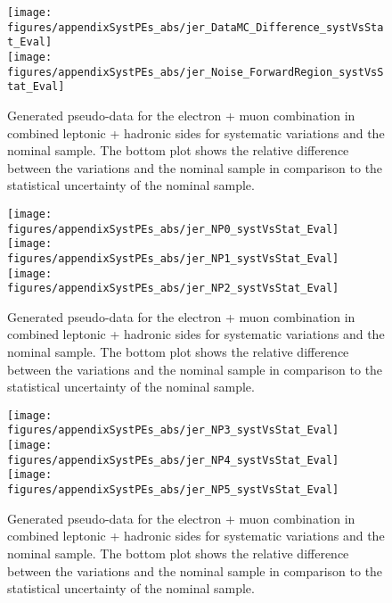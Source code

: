 \begin{figure}[!hb]
\begin{center}
        \texttt{[image: figures/appendixSystPEs\_abs/jer\_DataMC\_Difference\_systVsStat\_Eval]}\\
        \texttt{[image: figures/appendixSystPEs\_abs/jer\_Noise\_ForwardRegion\_systVsStat\_Eval]}\\
\caption{Generated pseudo-data for the electron + muon combination in combined leptonic + hadronic sides for systematic variations and the nominal \ttbar sample. The bottom plot shows the relative difference between the variations and the nominal sample in comparison to the statistical uncertainty of the nominal sample.}   
\label{fig:systematicVar_lephad_JER_1_1}
\end{center}
\end{figure}

\begin{figure}[!hb]
\begin{center}
        \texttt{[image: figures/appendixSystPEs\_abs/jer\_NP0\_systVsStat\_Eval]}\\
        \texttt{[image: figures/appendixSystPEs\_abs/jer\_NP1\_systVsStat\_Eval]}\\
        \texttt{[image: figures/appendixSystPEs\_abs/jer\_NP2\_systVsStat\_Eval]}\\
\caption{Generated pseudo-data for the electron + muon combination in combined leptonic + hadronic sides for systematic variations and the nominal \ttbar sample. The bottom plot shows the relative difference between the variations and the nominal sample in comparison to the statistical uncertainty of the nominal sample.}   
\label{fig:systematicVar_lephad_JER_1_2}
\end{center}
\end{figure}

\begin{figure}[!hb]
\begin{center}
        \texttt{[image: figures/appendixSystPEs\_abs/jer\_NP3\_systVsStat\_Eval]}\\
        \texttt{[image: figures/appendixSystPEs\_abs/jer\_NP4\_systVsStat\_Eval]}\\
        \texttt{[image: figures/appendixSystPEs\_abs/jer\_NP5\_systVsStat\_Eval]}\\
\caption{Generated pseudo-data for the electron + muon combination in combined leptonic + hadronic sides for systematic variations and the nominal \ttbar sample. The bottom plot shows the relative difference between the variations and the nominal sample in comparison to the statistical uncertainty of the nominal sample.}   
\label{fig:systematicVar_lephad_JER_1_3}
\end{center}
\end{figure}


